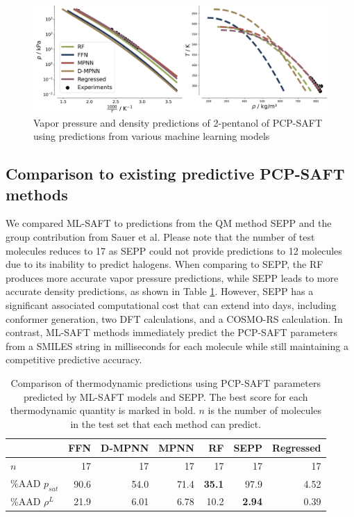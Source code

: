 \begin{figure}
    \centering
    \includegraphics[width=\textwidth]{gfx/Chapter07/2-Pentanol.png}
    \caption{Vapor pressure and density predictions of 2-pentanol of PCP-SAFT using predictions from various machine learning models}
    \label{fig:two_pentanol}
\end{figure}


\subsection{Comparison to existing predictive PCP-SAFT methods}

We compared ML-SAFT to predictions from the QM method SEPP\cite{Kaminski2020} and the group contribution from Sauer et al.\cite{Sauer2014}  Please note that the number of test molecules reduces to 17 as SEPP could not provide predictions to 12 molecules due to its inability to predict halogens. When comparing to SEPP, the RF produces more accurate vapor pressure predictions, while SEPP leads to more accurate density predictions, as shown in Table \ref{tab:sepp}. However, SEPP has a significant associated computational cost that can extend into days, including conformer generation, two DFT calculations, and a COSMO-RS calculation. In contrast, ML-SAFT methods immediately predict the PCP-SAFT parameters from a SMILES string in milliseconds for each molecule while still maintaining a competitive predictive accuracy. 

\begin{table}
	\caption{Comparison of thermodynamic predictions using PCP-SAFT parameters predicted by ML-SAFT models and SEPP.\cite{Kaminski2020} The best score for each thermodynamic quantity is marked in bold. $n$ is the number of molecules in the test set that each method can predict.}
        \label{tab:sepp}
	\begin{center}
		\begin{tabular}{lrrrrr|r}
			 & FFN & D-MPNN & MPNN & RF & SEPP & Regressed \\
			\hline
			$n$ & 17 & 17 & 17 & 17 & 17 & 17 \\
			\%AAD $p_{sat}$ & 90.6 & 54.0 & 71.4 & \textbf{35.1} & 97.9 & 4.52 \\
			\%AAD $\rho^{L}$ & 21.9 & 6.01 & 6.78 & 10.2 & \textbf{2.94} & 0.39 \\
		\end{tabular}

	\end{center}
\end{table}

